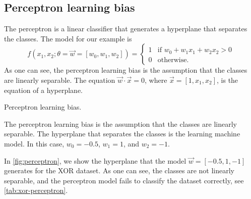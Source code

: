 \subsection{Perceptron learning bias}

The perceptron is a linear classifier that generates a hyperplane that separates the
classes.  The model for our example is
\begin{equation*}
  f(x_1, x_2; \theta = \vec{w} = \left[w_0, w_1, w_2\right]) =  \begin{cases}
    1 & \text{if } w_0 + w_1 x_1 + w_2 x_2 > 0 \\
    0 & \text{otherwise.}
  \end{cases}
\end{equation*}
As one can see, the perceptron learning bias is the assumption that the classes are
linearly separable. The equation $\vec{w} \cdot \vec{x} = 0$, where $\vec{x} = [1, x_1,
x_2]$, is the equation of a hyperplane.

\begin{figurebox}[label=fig:perceptron]{Perceptron learning bias.}
  \centering
  \tcblower
  The perceptron learning bias is the assumption that the classes are linearly separable.
  The hyperplane that separates the classes is the learning machine model.
  In this case, $w_0 = -0.5$, $w_1 = 1$, and $w_2 = -1$.
\end{figurebox}

In \cref{fig:perceptron}, we show the hyperplane that the model $\vec{w} = [-0.5, 1, -1]$
generates for the XOR dataset.  As one can see, the classes are not linearly separable,
and the perceptron model fails to classify the dataset correctly, see \cref{tab:xor-perceptron}.


